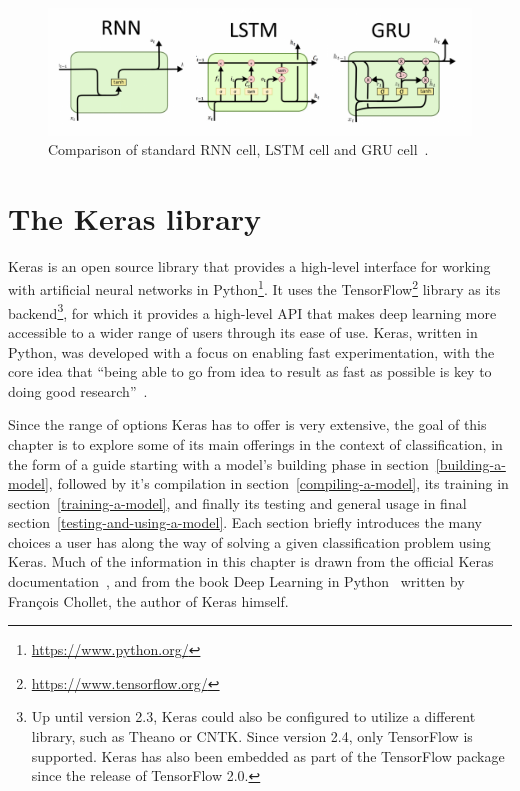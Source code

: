 \begin{figure}[!h]
    \centering
    \includegraphics[width=\linewidth]{obrazky-figures/RNN-vs-LSTM-vs-GRU.png}
    \caption{Comparison of standard RNN cell, LSTM cell and GRU cell~\cite{rnn-lstm-gru}.}
    \label{fig:rnn-lstm-gru}
\end{figure}






\chapter{The Keras library}
\label{the-keras-library}
Keras is an open source library that provides a high-level interface for working with artificial
neural networks in Python\footnote{\url{https://www.python.org/}}.
It uses the TensorFlow\footnote{\url{https://www.tensorflow.org/}} library as its
backend\footnote{Up until version 2.3, Keras could also be configured to utilize a different library,
such as Theano or CNTK. Since version 2.4, only TensorFlow is supported. Keras has also been embedded
as part of the TensorFlow package since the release of TensorFlow 2.0.}, for which it provides
a high-level API that makes deep learning more accessible to a wider range of users through its ease of use.
Keras, written in Python, was developed with a focus on enabling fast experimentation,
with the core idea that ``being able to go from idea to result as fast as possible is key
to doing good research''~\cite{keras-documentation}.

Since the range of options Keras has to offer is very extensive,
the goal of this chapter is to explore some of its main offerings in the context of classification,
in the form of a guide starting with a model's building phase in section~\ref{building-a-model},
followed by it's compilation in section~\ref{compiling-a-model}, its training in section~\ref{training-a-model},
and finally its testing and general usage in final section~\ref{testing-and-using-a-model}.
Each section briefly introduces the many choices a user has along the way of solving a given
classification problem using Keras. Much of the information in this chapter is drawn from the official
Keras documentation~\cite{keras-documentation}, and from the book Deep Learning in
Python~\cite{Deep-learning-with-Python} written by Fran\c{c}ois Chollet, the author of Keras himself.




